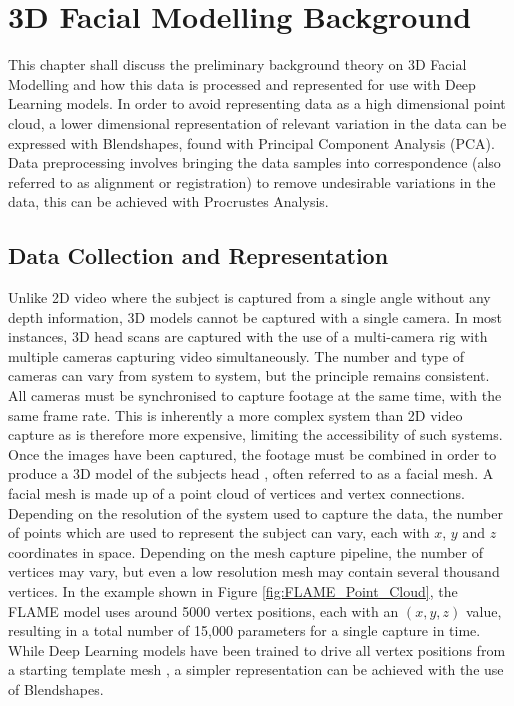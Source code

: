 %
%
%
%
%

\chapter{3D Facial Modelling Background}

This chapter shall discuss the preliminary background theory on 3D Facial Modelling and how this data is processed and represented for use with Deep Learning models.
In order to avoid representing data as a high dimensional point cloud, a lower dimensional representation of relevant variation in the data can be expressed with Blendshapes, found with Principal Component Analysis (PCA).
Data preprocessing involves bringing the data samples into correspondence (also referred to as alignment or registration) to remove undesirable variations in the data, this can be achieved with Procrustes Analysis.

\section{Data Collection and Representation}
Unlike 2D video where the subject is captured from a single angle without any depth information, 3D models cannot be captured with a single camera.
In most instances, 3D head scans are captured with the use of a multi-camera rig with multiple cameras capturing video simultaneously.
The number and type of cameras can vary from system to system, but the principle remains consistent.
All cameras must be synchronised to capture footage at the same time, with the same frame rate.
This is inherently a more complex system than 2D video capture as is therefore more expensive, limiting the accessibility of such systems.  
Once the images have been captured, the footage must be combined in order to produce a 3D model of the subjects head \cite{Li2017}, often referred to as a facial mesh.
A facial mesh is made up of a point cloud of vertices and vertex connections.
Depending on the resolution of the system used to capture the data, the number of points which are used to represent the subject can vary, each with $x$, $y$ and $z$ coordinates in space.
Depending on the mesh capture pipeline, the number of vertices may vary, but even a low resolution mesh may contain several thousand vertices.
In the example shown in Figure \ref{fig:FLAME_Point_Cloud}, the FLAME model \cite{Li2017} uses around 5000 vertex positions, each with an $(x, y, z)$ value, resulting in a total number of 15,000 parameters for a single capture in time.
While Deep Learning models have been trained to drive all vertex positions from a starting template mesh \cite{Karras2017a}, a simpler representation can be achieved with the use of Blendshapes.

